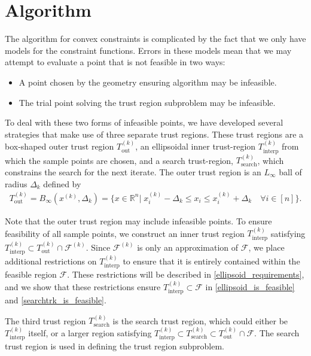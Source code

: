 \documentclass{article}
\theoremstyle{case}
\numberwithin{theorem}{subsection}
\newcommand{\dk}{\Delta_k}
\newcommand{\feasiblek}{{\mathcal F^{(k)}}}
\newcommand{\feasible}{{\mathcal F}}
\newcommand{\outertrk}{{T_{\text{out}}^{(k)}}}
\newcommand{\Rn}{\mathbb R^n}
\newcommand{\sampletrk}{{T_{\text{interp}}^{(k)}}}
\newcommand{\searchtrk}{{T_{\text{search}}^{(k)}}}
\newcommand{\tr}{{ B_{\infty}\left(\xk, \dk\right) }}
\newcommand{\xk}{x^{(k)}}
\begin{document}
\section{Algorithm}
\label{infeasible_point_strategies}


The algorithm for convex constraints is complicated by the fact that we only have models for the constraint functions.
Errors in these models mean that we may attempt to evaluate a point that is not feasible in two ways:
\begin{itemize}
\item A point chosen by the geometry ensuring algorithm may be infeasible.
\item The trial point solving the trust region subproblem may be infeasible.
\end{itemize}


To deal with these two forms of infeasible points, we have developed several strategies that make use of three separate trust regions.
These trust regions are a box-shaped outer trust region $\outertrk$,  an ellipsoidal inner trust-region $\sampletrk$ from which the sample points are chosen,  and a search trust-region, $\searchtrk$, which constrains the search for the next iterate.
The outer trust region is an $L_{\infty}$ ball of radius $ \dk $ defined by
\begin{align}
\outertrk = \tr = \{x\in \Rn | \; \xk_i - \dk \le x_i \le \xk_i + \dk \quad \forall i \in [n]\}. \label{define_outer_trust_region}
\end{align}

Note that the outer trust region may include infeasible points.
To ensure feasibility of all sample points, we construct an inner trust region  $ \sampletrk $  satisfying 
$\sampletrk \subset \outertrk \cap \feasiblek$.
Since $\feasiblek$ is only an approximation of $\feasible$,  we place additional restrictions on $\sampletrk$
to ensure that it is entirely contained within the feasible region $\feasible$.
These restrictions will be described in \cref{ellipsoid_requirements}, 
and we show that these restrictions ensure $\sampletrk \subset \feasible$ in \cref{ellipsoid_is_feasible} and \cref{searchtrk_is_feasible}.


The third trust region $\searchtrk$ is the search trust region, which could either be $\sampletrk$ itself, 
or a larger region satisfying $ \sampletrk \subset \searchtrk \subset \outertrk \cap \feasible$.
The search trust region is used in defining the trust region subproblem.
\end{document}
